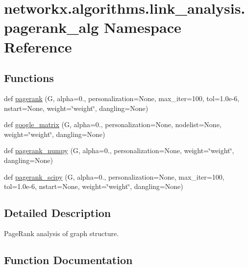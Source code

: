 \hypertarget{namespacenetworkx_1_1algorithms_1_1link__analysis_1_1pagerank__alg}{}\section{networkx.\+algorithms.\+link\+\_\+analysis.\+pagerank\+\_\+alg Namespace Reference}
\label{namespacenetworkx_1_1algorithms_1_1link__analysis_1_1pagerank__alg}
\subsection*{Functions}
\begin{DoxyCompactItemize}
\item 
def \hyperlink{namespacenetworkx_1_1algorithms_1_1link__analysis_1_1pagerank__alg_a348f8656b33900f6fc8b02b4086a691d}{pagerank} (G, alpha=0., personalization=None, max\+\_\+iter=100, tol=1.\+0e-\/6, nstart=\+None, weight=\char`\"{}weight\char`\"{}, dangling=\+None)
\item 
def \hyperlink{namespacenetworkx_1_1algorithms_1_1link__analysis_1_1pagerank__alg_a0b713200888595d91f821de76241cc13}{google\+\_\+matrix} (G, alpha=0., personalization=None, nodelist=None, weight=\char`\"{}weight\char`\"{}, dangling=None)
\item 
def \hyperlink{namespacenetworkx_1_1algorithms_1_1link__analysis_1_1pagerank__alg_a1497a95c921c7d781b592798eb0156d5}{pagerank\+\_\+numpy} (G, alpha=0., personalization=None, weight=\char`\"{}weight\char`\"{}, dangling=None)
\item 
def \hyperlink{namespacenetworkx_1_1algorithms_1_1link__analysis_1_1pagerank__alg_a88318dd05b863d99f9a9a0207182bfe7}{pagerank\+\_\+scipy} (G, alpha=0., personalization=None, max\+\_\+iter=100, tol=1.\+0e-\/6, nstart=\+None, weight=\char`\"{}weight\char`\"{}, dangling=\+None)
\end{DoxyCompactItemize}


\subsection{Detailed Description}
\begin{DoxyVerb}PageRank analysis of graph structure. \end{DoxyVerb}
 

\subsection{Function Documentation}
\mbox{\label{namespacenetworkx_1_1algorithms_1_1link__analysis_1_1pagerank__alg_a0b713200888595d91f821de76241cc13}} 
